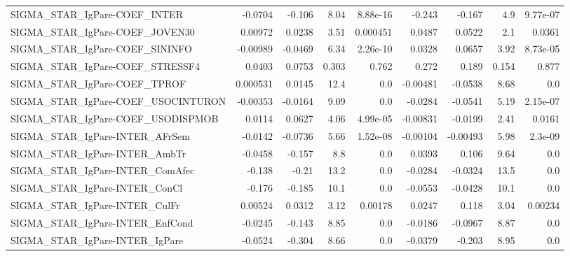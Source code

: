 \begin{tabular}{lrrrrrrrr}
SIGMA\_STAR\_IgPare-COEF\_INTER          &     -0.0704 &       -0.106 &     8.04 & 8.88e-16 &     -0.243 &      -0.167 &          4.9 &      9.77e-07 \\
SIGMA\_STAR\_IgPare-COEF\_JOVEN30        &     0.00972 &       0.0238 &     3.51 & 0.000451 &     0.0487 &      0.0522 &          2.1 &        0.0361 \\
SIGMA\_STAR\_IgPare-COEF\_SININFO        &    -0.00989 &      -0.0469 &     6.34 & 2.26e-10 &     0.0328 &      0.0657 &         3.92 &      8.73e-05 \\
SIGMA\_STAR\_IgPare-COEF\_STRESSF4       &      0.0403 &       0.0753 &    0.303 &    0.762 &      0.272 &       0.189 &        0.154 &         0.877 \\
SIGMA\_STAR\_IgPare-COEF\_TPROF          &    0.000531 &       0.0145 &     12.4 &      0.0 &   -0.00481 &     -0.0538 &         8.68 &           0.0 \\
SIGMA\_STAR\_IgPare-COEF\_USOCINTURON    &    -0.00353 &      -0.0164 &     9.09 &      0.0 &    -0.0284 &     -0.0541 &         5.19 &      2.15e-07 \\
SIGMA\_STAR\_IgPare-COEF\_USODISPMOB     &      0.0114 &       0.0627 &     4.06 & 4.99e-05 &   -0.00831 &     -0.0199 &         2.41 &        0.0161 \\
SIGMA\_STAR\_IgPare-INTER\_AFrSem        &     -0.0142 &      -0.0736 &     5.66 & 1.52e-08 &   -0.00104 &    -0.00493 &         5.98 &       2.3e-09 \\
SIGMA\_STAR\_IgPare-INTER\_AmbTr         &     -0.0458 &       -0.157 &      8.8 &      0.0 &     0.0393 &       0.106 &         9.64 &           0.0 \\
SIGMA\_STAR\_IgPare-INTER\_ComAfec       &      -0.138 &        -0.21 &     13.2 &      0.0 &    -0.0284 &     -0.0324 &         13.5 &           0.0 \\
SIGMA\_STAR\_IgPare-INTER\_ConCl         &      -0.176 &       -0.185 &     10.1 &      0.0 &    -0.0553 &     -0.0428 &         10.1 &           0.0 \\
SIGMA\_STAR\_IgPare-INTER\_CulFr         &     0.00524 &       0.0312 &     3.12 &  0.00178 &     0.0247 &       0.118 &         3.04 &       0.00234 \\
SIGMA\_STAR\_IgPare-INTER\_EnfCond       &     -0.0245 &       -0.143 &     8.85 &      0.0 &    -0.0186 &     -0.0967 &         8.87 &           0.0 \\
SIGMA\_STAR\_IgPare-INTER\_IgPare        &     -0.0524 &       -0.304 &     8.66 &      0.0 &    -0.0379 &      -0.203 &         8.95 &           0.0 \\

\end{tabular}
